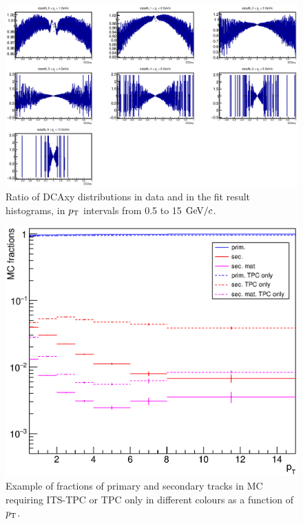 \begin{figure}[!htb]
\begin{center}
\includegraphics[width=.99\textwidth]{FigCap4/ratioDataFit_b_VsPt.eps}
\caption{Ratio of DCAxy distributions in data and in the fit result histograms, in $p_{\rm T}$ intervals from 0.5 to 15 $\mathrm{GeV}/c$.}
\label{fig:DCAxyRatioDataFitVsPt}
\end{center}
\end{figure}

\begin{figure}[!htb]
\begin{center}
\includegraphics[width=.50\textwidth]{FigCap4/MCfractions_KaonPion_ESDTrOnly_b_VsPt.eps}
\caption{Example of fractions of primary and secondary tracks in MC requiring ITS-TPC or TPC only in different colours as a function of $p_{\rm T}$.}
\label{fig:MCfractions}
\end{center}
\end{figure}

